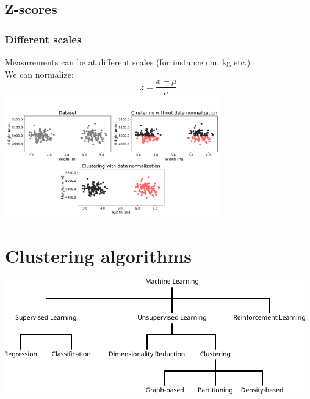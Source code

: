 \documentclass[Nike]{tuberlinbeamer}
\begin{document}
\subsection{Z-scores}
\begin{frame}
  \frametitle{Different scales}
  Measurements can be at different scales (for instance cm, kg etc.)\\
  We can normalize:
  \begin{equation*}
    z = \frac{x - \mu}{\sigma}
  \end{equation*}
  \pause
  \centering\includegraphics[width=0.7\textwidth]{normalization_clustering.png}
  \tiny \cite{guerin_clustering_2017}
\end{frame}


\section{Clustering algorithms}
\begin{frame}
  \vfill
  \centering\includegraphics[width=\textwidth]{ml_schema_ext}
  \vfill
\end{frame}
\end{document}
